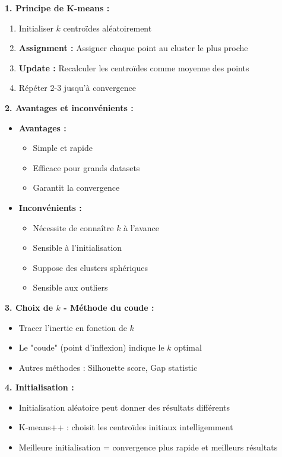 \documentclass[11pt,a4paper]{article}
\begin{document}
\begin{solutionbox}
\textbf{1. Principe de K-means :}
\begin{enumerate}
    \item Initialiser $k$ centroïdes aléatoirement
    \item \textbf{Assignment :} Assigner chaque point au cluster le plus proche
    \item \textbf{Update :} Recalculer les centroïdes comme moyenne des points
    \item Répéter 2-3 jusqu'à convergence
\end{enumerate}

\textbf{2. Avantages et inconvénients :}
\begin{itemize}
    \item \textbf{Avantages :}
    \begin{itemize}
        \item Simple et rapide
        \item Efficace pour grands datasets
        \item Garantit la convergence
    \end{itemize}
    \item \textbf{Inconvénients :}
    \begin{itemize}
        \item Nécessite de connaître $k$ à l'avance
        \item Sensible à l'initialisation
        \item Suppose des clusters sphériques
        \item Sensible aux outliers
    \end{itemize}
\end{itemize}

\textbf{3. Choix de $k$ - Méthode du coude :}
\begin{itemize}
    \item Tracer l'inertie en fonction de $k$
    \item Le "coude" (point d'inflexion) indique le $k$ optimal
    \item Autres méthodes : Silhouette score, Gap statistic
\end{itemize}

\textbf{4. Initialisation :}
\begin{itemize}
    \item Initialisation aléatoire peut donner des résultats différents
    \item K-means++ : choisit les centroïdes initiaux intelligemment
    \item Meilleure initialisation = convergence plus rapide et meilleurs résultats
\end{itemize}


\end{solutionbox}
\end{document}
